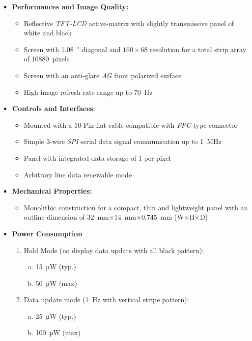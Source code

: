 \documentclass[report.tex]{subfiles}
\begin{document}
\begin{itemize}
\item \textbf{Performances and Image Quality:}
\begin{itemize}
\item Reflective \textit{TFT-LCD} active-matrix with slightly transmissive panel of white and black
\item Screen with \SI{1.08}{"} diagonal and $160 \times 68$ resolution for a total strip array of \SI{10880}{pixels}
\item Screen with an anti-glare \textit{AG} front polarized surface
\item High image refresh rate range up to \SI{70}{\hertz}
\end{itemize}
\item \textbf{Controls and Interfaces}:
\begin{itemize}
\item Mounted with a 10-Pin flat cable compatible with \textit{FPC} type connector
\item Simple 3-wire \textit{SPI} serial data signal communication up to \SI{1}{\mega\hertz}
\item Panel with integrated data storage of \SI{1}{\bit} per pixel
\item Arbitrary line data renewable mode
\end{itemize}
\item \textbf{Mechanical Properties:}
\begin{itemize}[\quad\;\;]
\item Monolithic construction for a compact, thin and lightweight panel with an outline dimension of \SI{32}{\milli\meter}$\times$\SI{14}{\milli\meter}$\times$\SI{0.745}{\milli\meter} (W$\times$H$\times$D)
\end{itemize}
\item \textbf{Power Consumption}
\begin{enumerate}
\item Hold Mode (no display data update with all black pattern):
\begin{enumerate}[a)]
\item \SI{15}{\micro\watt} (typ.)
\item \SI{50}{\micro\watt} (max)
\end{enumerate}
\item Data update mode (\SI{1}{\hertz} with vertical stripe pattern):
\begin{enumerate}[a)]
\item \SI{25}{\micro\watt} (typ.)
\item \SI{100}{\micro\watt} (max)
\end{enumerate}
\end{enumerate}
\end{itemize}
\end{document}
